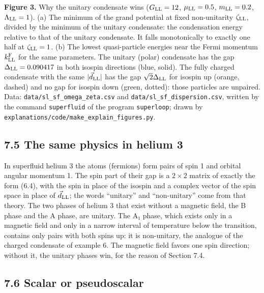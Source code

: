 \documentclass[
  10pt,
]{article}
\begin{document}
\textbf{Figure 3.} Why the unitary condensate wins (\(G_{\rm LL}=12\),
\(\mu_{\rm LL}=0.5\), \(m_{\rm LL}=0.2\), \(\Lambda_{\rm LL}=1\)). (a)
The minimum of the grand potential at fixed non-unitarity
\(\zeta_{\rm LL}\), divided by the minimum of the unitary condensate:
the condensation energy relative to that of the unitary condensate. It
falls monotonically to exactly one half at \(\zeta_{\rm LL}=1\). (b) The
lowest quasi-particle energies near the Fermi momentum
\(k^{\rm F}_{\rm LL}\) for the same parameters. The unitary (polar)
condensate has the gap \(\Delta_{\rm LL}={}0.090417\) in both isospin
directions (blue, solid). The fully charged condensate with the same
\(\lvert\vec d_{\rm LL}\rvert\) has the gap \(\sqrt2\Delta_{\rm LL}\)
for isospin up (orange, dashed) and no gap for isospin down (green,
dotted): those particles are unpaired. Data:
\texttt{data/sl\_sf\_omega\_zeta.csv} and
\texttt{data/sl\_sf\_dispersion.csv}, written by the command
\texttt{superfluid} of the program \texttt{superloop}; drawn by
\texttt{explanations/code/make\_explain\_figures.py}.

\hypertarget{the-same-physics-in-helium-3}{%
\subsection{7.5 The same physics in helium
3}\label{the-same-physics-in-helium-3}}

In superfluid helium 3 the atoms (fermions) form pairs of spin 1 and
orbital angular momentum 1. The spin part of their gap is a \(2\times2\)
matrix of exactly the form (6.4), with the spin in place of the isospin
and a complex vector of the spin space in place of \(\vec d_{\rm LL}\);
the words ``unitary'' and ``non-unitary'' come from that theory. The two
phases of helium 3 that exist without a magnetic field, the B phase and
the A phase, are unitary. The A₁ phase, which exists only in a magnetic
field and only in a narrow interval of temperature below the transition,
contains only pairs with both spins up: it is non-unitary, the analogue
of the charged condensate of example 6. The magnetic field favors one
spin direction; without it, the unitary phases win, for the reason of
Section 7.4.

\hypertarget{scalar-or-pseudoscalar}{%
\subsection{7.6 Scalar or pseudoscalar}\label{scalar-or-pseudoscalar}}
\end{document}
